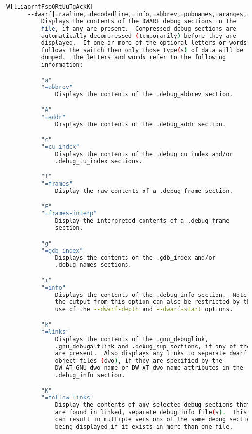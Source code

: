 {{\begin{lstlisting}[language=bash]
       -W[lLiaprmfFsoORtUuTgAckK]
       --dwarf[=rawline,=decodedline,=info,=abbrev,=pubnames,=aranges,=macro,=frames,=frames-interp,=str,=str-offsets,=loc,=Ranges,=pubtypes,=trace_info,=trace_abbrev,=trace_aranges,=gdb_index,=addr,=cu_index,=links,=follow-links]
           Displays the contents of the DWARF debug sections in the
           file, if any are present.  Compressed debug sections are
           automatically decompressed (temporarily) before they are
           displayed.  If one or more of the optional letters or words
           follows the switch then only those type(s) of data will be
           dumped.  The letters and words refer to the following
           information:

           "a"
           "=abbrev"
               Displays the contents of the .debug_abbrev section.

           "A"
           "=addr"
               Displays the contents of the .debug_addr section.

           "c"
           "=cu_index"
               Displays the contents of the .debug_cu_index and/or
               .debug_tu_index sections.

           "f"
           "=frames"
               Display the raw contents of a .debug_frame section.

           "F"
           "=frames-interp"
               Display the interpreted contents of a .debug_frame
               section.

           "g"
           "=gdb_index"
               Displays the contents of the .gdb_index and/or
               .debug_names sections.

           "i"
           "=info"
               Displays the contents of the .debug_info section.  Note:
               the output from this option can also be restricted by the
               use of the --dwarf-depth and --dwarf-start options.

           "k"
           "=links"
               Displays the contents of the .gnu_debuglink,
               .gnu_debugaltlink and .debug_sup sections, if any of them
               are present.  Also displays any links to separate dwarf
               object files (dwo), if they are specified by the
               DW_AT_GNU_dwo_name or DW_AT_dwo_name attributes in the
               .debug_info section.

           "K"
           "=follow-links"
               Display the contents of any selected debug sections that
               are found in linked, separate debug info file(s).  This
               can result in multiple versions of the same debug section
               being displayed if it exists in more than one file.


\end{lstlisting}}}
